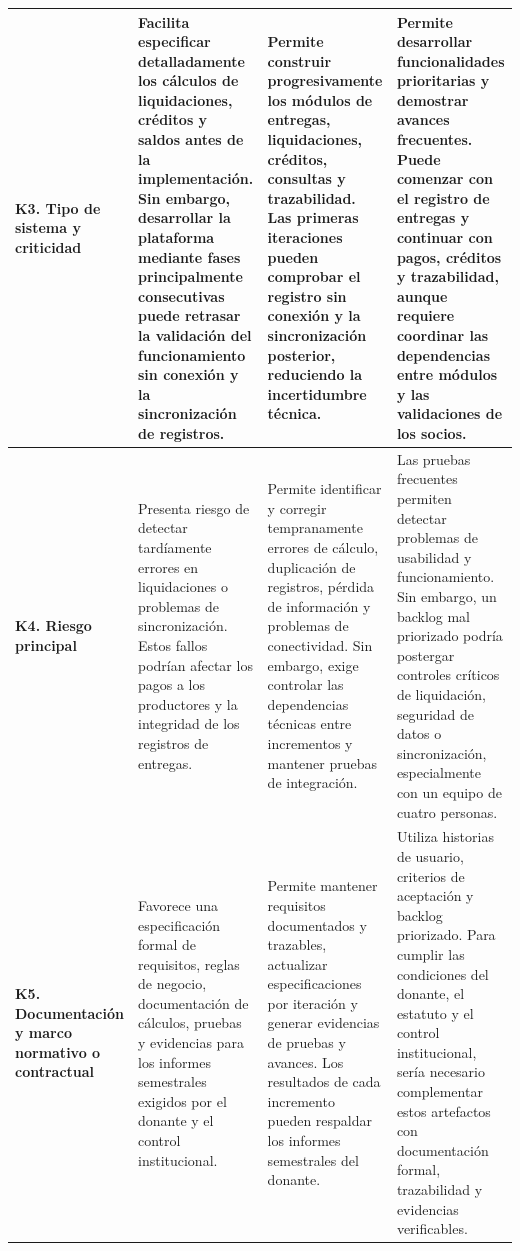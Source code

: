 \documentclass[12pt,a4paper]{article}
\begin{document}
\begin{longtable}{|>{\raggedright\arraybackslash}p{}|>{\raggedright\arraybackslash}p{}|>{\raggedright\arraybackslash}p{}|>{\raggedright\arraybackslash}p{}|}
\textbf{K3. Tipo de sistema y criticidad} &
Facilita especificar detalladamente los cálculos de liquidaciones, créditos y saldos antes de la implementación. Sin embargo, desarrollar la plataforma mediante fases principalmente consecutivas puede retrasar la validación del funcionamiento sin conexión y la sincronización de registros. &
Permite construir progresivamente los módulos de entregas, liquidaciones, créditos, consultas y trazabilidad. Las primeras iteraciones pueden comprobar el registro sin conexión y la sincronización posterior, reduciendo la incertidumbre técnica. &
Permite desarrollar funcionalidades prioritarias y demostrar avances frecuentes. Puede comenzar con el registro de entregas y continuar con pagos, créditos y trazabilidad, aunque requiere coordinar las dependencias entre módulos y las validaciones de los socios. \\
\hline

\textbf{K4. Riesgo principal} &
Presenta riesgo de detectar tardíamente errores en liquidaciones o problemas de sincronización. Estos fallos podrían afectar los pagos a los productores y la integridad de los registros de entregas. &
Permite identificar y corregir tempranamente errores de cálculo, duplicación de registros, pérdida de información y problemas de conectividad. Sin embargo, exige controlar las dependencias técnicas entre incrementos y mantener pruebas de integración. &
Las pruebas frecuentes permiten detectar problemas de usabilidad y funcionamiento. Sin embargo, un backlog mal priorizado podría postergar controles críticos de liquidación, seguridad de datos o sincronización, especialmente con un equipo de cuatro personas. \\
\hline

\textbf{K5. Documentación y marco normativo o contractual} &
Favorece una especificación formal de requisitos, reglas de negocio, documentación de cálculos, pruebas y evidencias para los informes semestrales exigidos por el donante y el control institucional. &
Permite mantener requisitos documentados y trazables, actualizar especificaciones por iteración y generar evidencias de pruebas y avances. Los resultados de cada incremento pueden respaldar los informes semestrales del donante. &
Utiliza historias de usuario, criterios de aceptación y backlog priorizado. Para cumplir las condiciones del donante, el estatuto y el control institucional, sería necesario complementar estos artefactos con documentación formal, trazabilidad y evidencias verificables. \\
\hline

\end{longtable}
\endgroup
\end{document}
